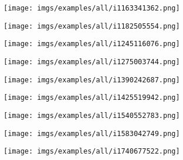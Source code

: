 \documentclass{article}
\begin{document}
\begin{figure}[htbp]
  \begin{subfigure}{0.3\textwidth}
    \texttt{[image: imgs/examples/all/i1163341362.png]}
  \end{subfigure}
  \begin{subfigure}{0.3\textwidth}
    \texttt{[image: imgs/examples/all/i1182505554.png]}
  \end{subfigure}
  \begin{subfigure}{0.3\textwidth}
    \texttt{[image: imgs/examples/all/i1245116076.png]}
  \end{subfigure}
  
  \begin{subfigure}{0.3\textwidth}
    \texttt{[image: imgs/examples/all/i1275003744.png]}
  \end{subfigure}
  \begin{subfigure}{0.3\textwidth}
    \texttt{[image: imgs/examples/all/i1390242687.png]}
  \end{subfigure}
  \begin{subfigure}{0.3\textwidth}
    \texttt{[image: imgs/examples/all/i1425519942.png]}
  \end{subfigure}
  
  \begin{subfigure}{0.3\textwidth}
    \texttt{[image: imgs/examples/all/i1540552783.png]}
  \end{subfigure}
  \begin{subfigure}{0.3\textwidth}
    \texttt{[image: imgs/examples/all/i1583042749.png]}
  \end{subfigure}
  \begin{subfigure}{0.3\textwidth}
    \texttt{[image: imgs/examples/all/i1740677522.png]}
  \end{subfigure}
  
\end{figure}
\end{document}
